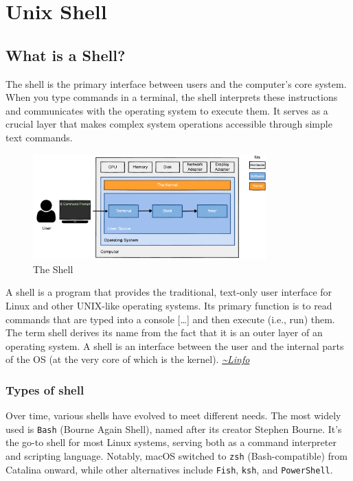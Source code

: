 \chapter{Unix Shell}

\section{What is a Shell?}

The shell is the primary interface between users and the computer's core system. When you type commands in a terminal, the shell interprets these instructions and communicates with the operating system to execute them. It serves as a crucial layer that makes complex system operations accessible through simple text commands.

\begin{figure}[H]
    \centering
    \includegraphics[width=0.8\textwidth]{assets/shell.png}
    \caption{The Shell}
    \label{fig:shell}
\end{figure}

\begin{definitionblock}[Shell]
    A shell is a program that provides the traditional, text-only user interface for Linux and other UNIX-like operating systems. Its primary function is to read commands that are typed into a console […] and then execute (i.e., run) them. The term shell derives its name from the fact that it is an outer layer of an operating system. A shell is an interface between the user and the internal parts of the OS (at the very core of which is the kernel). 
    \hfill \textit{\href{http://www.linfo.org/shell.html}{\textasciitilde Linfo}}
\end{definitionblock}

\subsection{Types of shell}

Over time, various shells have evolved to meet different needs. The most widely used is \texttt{Bash} (Bourne Again Shell), named after its creator Stephen Bourne. It's the go-to shell for most Linux systems, serving both as a command interpreter and scripting language.
Notably, macOS switched to \texttt{zsh} (Bash-compatible) from Catalina onward, while other alternatives include \texttt{Fish}, \texttt{ksh}, and \texttt{PowerShell}.

